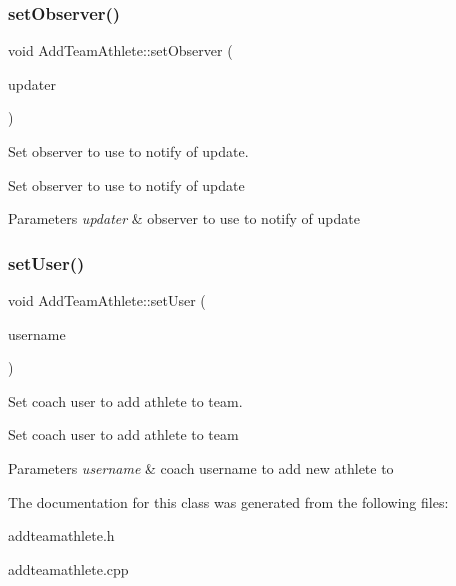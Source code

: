 \subsubsection{\texorpdfstring{setObserver()}{setObserver()}}
{\footnotesize\ttfamily void Add\+Team\+Athlete\+::set\+Observer (\begin{DoxyParamCaption}\item[{\mbox{\hyperlink{classFileUpdater}{File\+Updater}} $\ast$}]{updater }\end{DoxyParamCaption})}



Set observer to use to notify of update. 

Set observer to use to notify of update 
\begin{DoxyParams}{Parameters}
{\em updater} & observer to use to notify of update \\
\hline
\end{DoxyParams}
\mbox{\label{classAddTeamAthlete_a9282adf00e9e672c085976c1b496fdce}} 
\subsubsection{\texorpdfstring{setUser()}{setUser()}}
{\footnotesize\ttfamily void Add\+Team\+Athlete\+::set\+User (\begin{DoxyParamCaption}\item[{std\+::string}]{username }\end{DoxyParamCaption})}



Set coach user to add athlete to team. 

Set coach user to add athlete to team 
\begin{DoxyParams}{Parameters}
{\em username} & coach username to add new athlete to \\
\hline
\end{DoxyParams}


The documentation for this class was generated from the following files\+:\begin{DoxyCompactItemize}
\item 
addteamathlete.\+h\item 
addteamathlete.\+cpp\end{DoxyCompactItemize}
